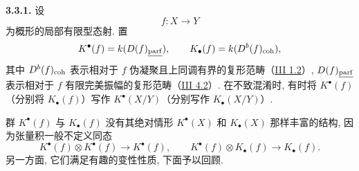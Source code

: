 \textbf{3.3.1.} 设
\[
 f:X\longrightarrow Y
\]
为概形的局部有限型态射. 置
\[
 K^{\bullet}(f)=k(D(f)_{\underline{\operatorname{parf}}}),\qquad
 K_{\bullet}(f)=k(D^b(f)_{\operatorname{coh}}),
\]
其中 \(D^b(f)_{\operatorname{coh}}\) 表示相对于 \(f\) 伪凝聚且上同调有界的复形范畴（\hyperlink{sga6.e03.def.1-2}{III 1.2}）, \(D(f)_{\underline{\operatorname{parf}}}\) 表示相对于 \(f\) 有限完美振幅的复形范畴（\hyperlink{sga6.e03.notation.4-2}{III 4.2}）. 在不致混淆时, 有时将 \(K^{\bullet}(f)\)（分别将 \(K_{\bullet}(f)\)）写作 \(K^{\bullet}(X/Y)\)（分别写作 \(K_{\bullet}(X/Y)\)）.

群 \(K^{\bullet}(f)\) 与 \(K_{\bullet}(f)\) 没有其绝对情形 \(K^{\bullet}(X)\) 和 \(K_{\bullet}(X)\) 那样丰富的结构, 因为张量积一般不定义同态
\[
 K^{\bullet}(f)\otimes K^{\bullet}(f)\longrightarrow K^{\bullet}(f),
 \qquad
 K^{\bullet}(f)\otimes K_{\bullet}(f)\longrightarrow K_{\bullet}(f).
\]
另一方面, 它们满足有趣的变性性质, 下面予以回顾.

